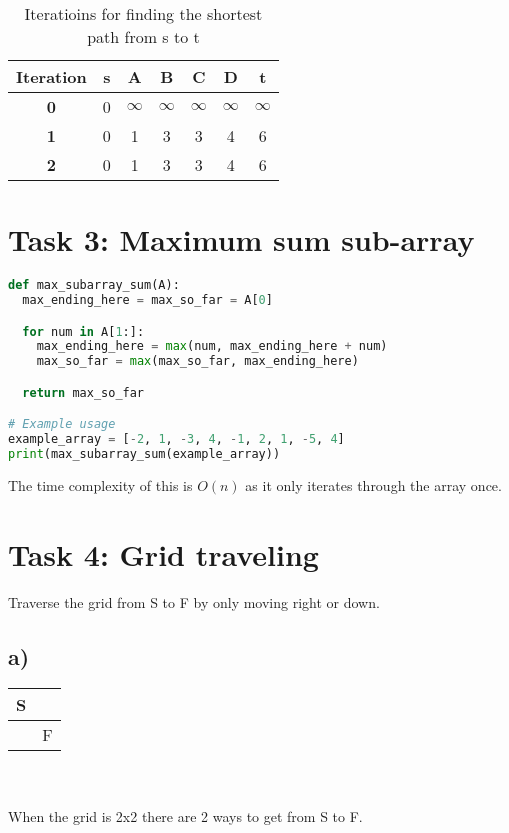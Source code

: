 \documentclass[12pt]{article}
\begin{document}
\begin{table}[h]
  \centering
  \begin{tabular}{c|c|c|c|c|c|c}
  \textbf{Iteration} & \textbf{s} & \textbf{A} & \textbf{B} & \textbf{C} & \textbf{D} & \textbf{t}\\
  \hline
  \textbf{0} & 0  & $\infty$  & $\infty$ & $\infty$ & $\infty$ & $\infty$\\
  \textbf{1} & 0 & 1 & 3 & 3 & 4 & 6\\
  \textbf{2} & 0 & 1 & 3 & 3 & 4 & 6\\
  \end{tabular}
  \caption{Iteratioins for finding the shortest path from s to t}
  \label{tab:2b}
\end{table}

\section*{Task 3: Maximum sum sub-array}
\begin{lstlisting}[language=Python]
def max_subarray_sum(A):
  max_ending_here = max_so_far = A[0]

  for num in A[1:]:
    max_ending_here = max(num, max_ending_here + num)
    max_so_far = max(max_so_far, max_ending_here)

  return max_so_far

# Example usage
example_array = [-2, 1, -3, 4, -1, 2, 1, -5, 4]
print(max_subarray_sum(example_array))
\end{lstlisting}
The time complexity of this is $O(n)$ as it only iterates through the array once.

\section*{Task 4: Grid traveling}
Traverse the grid from S to F by only moving right or down.

\subsection*{a)}
\begin{tabular}{|p{.3cm}|p{.3cm}|}
  \hline
  S &   \\
  \hline
    & F \\
  \hline
\end{tabular}\\\\
When the grid is 2x2 there are 2 ways to get from S to F.
\end{document}
